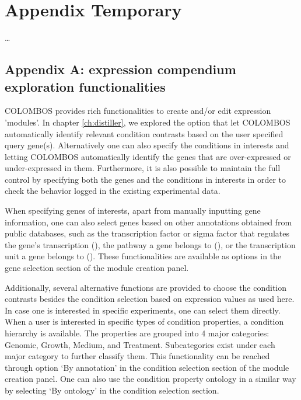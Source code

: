 \chapter{Appendix Temporary}\label{ch:myappendix}

\ldots

\instructionsappendices


\section{Appendix A: expression compendium exploration 
functionalities}\label{apd:colombos}

COLOMBOS provides rich functionalities to create and/or edit expression 
'modules'. In chapter \ref{ch:distiller}, we explored the option that let 
COLOMBOS automatically identify relevant condition contrasts based on 
the user specified query gene(s).  Alternatively one can also 
specify the conditions in interests and letting COLOMBOS automatically identify 
the genes that are over-expressed or under-expressed in them. Furthermore, it 
is also possible to maintain the full control by specifying both the genes and 
the conditions in interests in order to check the behavior logged in the 
existing experimental data.

When specifying genes of interests, apart from manually inputting gene 
information, one can also select genes based on other annotations obtained from 
public databases, such as the transcription factor or sigma factor that 
regulates the gene’s transcription (\cite{Gama-Castro2008}), the pathway a gene 
belongs to (\cite{Karp2005}), or the transcription unit a gene belongs to 
(\cite{Karp2005}). 
These functionalities are available as options in the gene selection section 
of the module creation panel. 

Additionally, several alternative functions are provided to choose the 
condition contrasts besides the condition selection based on expression values 
as used here. In case one is interested in specific experiments, one can select 
them directly. When a user is interested in specific types of condition 
properties, a condition hierarchy is available. The properties are grouped into 
4 major categories: Genomic, Growth, Medium, and Treatment. Subcategories exist 
under each major category to further classify them. This functionality can be 
reached through option `By annotation' in the condition selection section 
of the module creation panel. One can also use the condition 
property ontology in a similar way by selecting `By ontology' in the condition 
selection section.

